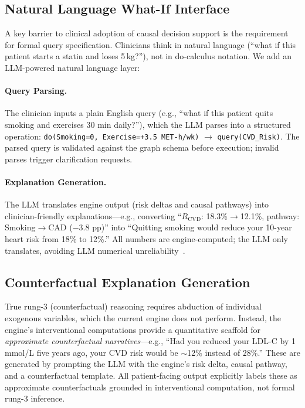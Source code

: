 \documentclass[runningheads]{llncs}
\begin{document}
\subsection{Natural Language What-If Interface}\label{sec:llminterface}

A key barrier to clinical adoption of causal decision support is
the requirement for formal query specification.
Clinicians think in natural language (``what if this patient starts
a statin and loses 5\,kg?''), not in do-calculus notation.
We add an LLM-powered natural language layer:

\paragraph{Query Parsing.}
The clinician inputs a plain English query (e.g., ``what if this
patient quits smoking and exercises 30 min daily?''), which the LLM
parses into a structured operation:
\texttt{do(Smoking=0, Exercise=+3.5 MET-h/wk)} $\to$
\texttt{query(CVD\_Risk)}.
The parsed query is validated against the graph schema before
execution; invalid parses trigger clarification requests.

\paragraph{Explanation Generation.}
The LLM translates engine output (risk deltas and causal pathways)
into clinician-friendly explanations---e.g., converting
``$R_{\text{CVD}}$: 18.3\%$\to$12.1\%, pathway:
Smoking$\to$CAD ($-$3.8 pp)'' into ``Quitting smoking would reduce
your 10-year heart risk from 18\% to 12\%.''
All numbers are engine-computed; the LLM only translates,
avoiding LLM numerical unreliability~\cite{jin2023cladder}.

\subsection{Counterfactual Explanation Generation}\label{sec:counterfactual}

True rung-3 (counterfactual) reasoning requires abduction of
individual exogenous variables, which the current engine does not
perform.
Instead, the engine's interventional computations provide a
quantitative scaffold for \emph{approximate counterfactual
narratives}---e.g., ``Had you reduced your LDL-C by 1\,mmol/L
five years ago, your CVD risk would be ${\sim}$12\% instead of
28\%.''
These are generated by prompting the LLM with the engine's risk
delta, causal pathway, and a counterfactual template.
All patient-facing output explicitly labels these as approximate
counterfactuals grounded in interventional computation, not formal
rung-3 inference.
\end{document}

